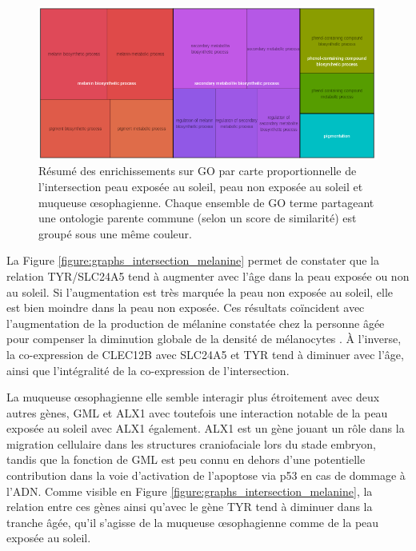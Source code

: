 \begin{figure}[hb]
    \centering
    \includegraphics[width=1\textwidth]{img/chap2/chap2_revigo_resume_enrich_skin.png}
    \caption[Résumé des enrichissements sur GO par carte proportionnelle de l'intersection peau exposée au soleil, peau non exposée au soleil et muqueuse œsophagienne]{Résumé des enrichissements sur GO par carte proportionnelle de l'intersection peau exposée au soleil, peau non exposée au soleil et muqueuse œsophagienne. Chaque ensemble de GO terme partageant une ontologie parente commune (selon un score de similarité) est groupé sous une même couleur.}
    \label{figure:revigo_resume_melanine}
\end{figure}

La Figure \ref{figure:graphs_intersection_melanine} permet de constater que la relation TYR/SLC24A5 tend à augmenter avec l'âge dans la peau exposée ou non au soleil. Si l'augmentation est très marquée la peau non exposée au soleil, elle est bien moindre dans la peau non exposée. Ces résultats coïncident avec l'augmentation de la production de mélanine constatée chez la personne âgée pour compenser la diminution globale de la densité de mélanocytes . À l'inverse, la co-expression de CLEC12B avec SLC24A5 et TYR tend à diminuer avec l'âge, ainsi que l'intégralité de la co-expression de l'intersection.

La muqueuse œsophagienne elle semble interagir plus étroitement avec deux autres gènes, GML et ALX1 avec toutefois une interaction notable de la peau exposée au soleil avec ALX1 également. ALX1 est un gène jouant un rôle dans la migration cellulaire dans les structures craniofaciale lors du stade embryon, tandis que la fonction de GML est peu connu en dehors d'une potentielle contribution dans la voie d'activation de l'apoptose via p53 en cas de dommage à l'ADN. Comme visible en Figure \ref{figure:graphs_intersection_melanine}, la relation entre ces gènes ainsi qu'avec le gène TYR tend à diminuer dans la tranche âgée, qu'il s'agisse de la muqueuse œsophagienne comme de la peau exposée au soleil.





